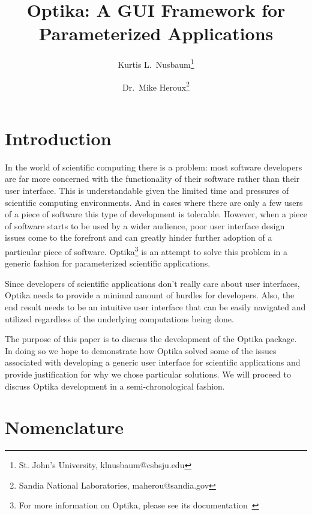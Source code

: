 \documentclass{csri10}
\title{Optika: A GUI Framework for Parameterized Applications}
\author{Kurtis L.\ Nusbaum\thanks{St. John's University, klnusbaum@csbsju.edu} \and Dr.\ Mike Heroux\thanks{Sandia National Laboratories,
maherou@sandia.gov}}
\begin{document}
\maketitle

\begin{abstract}

\end{abstract}

\section{Introduction}
In the world of scientific computing there is a problem: most software developers are far more concerned
with the functionality of their software rather than their user interface. This is understandable given
the limited time and pressures of scientific computing environments. And in 
cases where there are only a few users of a piece of software this type of development is tolerable. However, when a piece of
software starts to be used by a wider audience, poor user interface design issues come to the forefront and 
can greatly hinder further adoption of a particular piece of software. Optika\footnote{For more information on Optika, please see
its documentation~\cite{OptikaPackage}} is an attempt to solve this
problem in a generic fashion for parameterized scientific applications.

Since developers of scientific applications don't really care about user interfaces, Optika needs
to provide a minimal amount of hurdles for developers. Also, the end result needs to be an intuitive
user interface that can be easily navigated and utilized regardless of the underlying computations being done.

The purpose of this paper is to discuss the development of the Optika package. In doing so we hope to
demonstrate how Optika solved some of the issues associated with developing a generic user interface
for scientific applications and provide justification for why we chose particular solutions. We will
proceed to discuss Optika development in a semi-chronological fashion.


\appendix
\section{Nomenclature}



%
\end{document}
